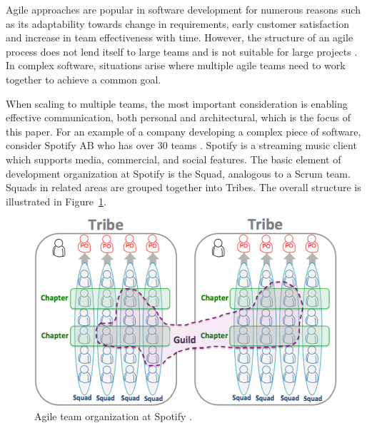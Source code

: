 

Agile approaches are popular in software development for numerous reasons such as its adaptability towards change in requirements, early customer satisfaction and increase in team effectiveness with time.
However, the structure of an agile process does not lend itself to large teams and is not suitable for large projects \cite{Rubin12}.
In complex software, situations arise where multiple agile teams need to work together to achieve a common goal.

When scaling to multiple teams, the most important consideration is enabling effective communication, both personal and architectural, which is the focus of this paper.
%
For an example of a company developing a complex piece of software, consider Spotify AB who has over 30 teams \cite{kniberg12}.
Spotify is a streaming music client which supports media, commercial, and social features.
The basic element of development organization at Spotify is the Squad, analogous to a Scrum team.
Squads in related areas are grouped together into Tribes. 
The overall structure is illustrated in Figure~\ref{fig:spotify_structure}.
\begin{figure}[h]
  \includegraphics[width=\linewidth]{images/kniberg12_structure.png}
  \caption{Agile team organization at Spotify \cite{kniberg12}.}
  \label{fig:spotify_structure}
\end{figure}


